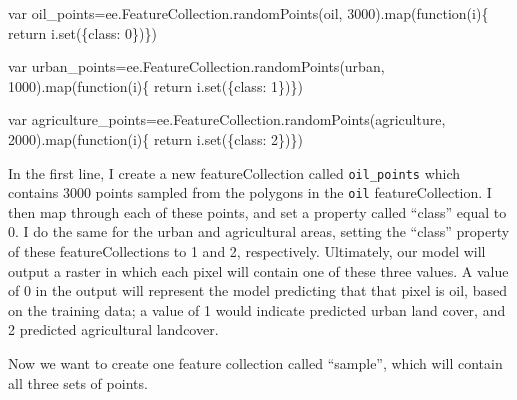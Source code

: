 \documentclass[
  letterpaper,
  DIV=11,
  numbers=noendperiod]{scrreprt}
\newenvironment{Shaded}{\begin{snugshade}}{\end{snugshade}}
\newcommand{\AttributeTok}[1]{\textcolor[rgb]{0.40,0.45,0.13}{#1}}
\newcommand{\ControlFlowTok}[1]{\textcolor[rgb]{0.00,0.23,0.31}{#1}}
\newcommand{\DecValTok}[1]{\textcolor[rgb]{0.68,0.00,0.00}{#1}}
\newcommand{\FunctionTok}[1]{\textcolor[rgb]{0.28,0.35,0.67}{#1}}
\newcommand{\KeywordTok}[1]{\textcolor[rgb]{0.00,0.23,0.31}{#1}}
\newcommand{\NormalTok}[1]{\textcolor[rgb]{0.00,0.23,0.31}{#1}}
\newcommand{\OperatorTok}[1]{\textcolor[rgb]{0.37,0.37,0.37}{#1}}
\newcommand{\StringTok}[1]{\textcolor[rgb]{0.13,0.47,0.30}{#1}}
\begin{document}
\begin{Shaded}
\begin{Highlighting}[]
\KeywordTok{var}\NormalTok{ oil\_points}\OperatorTok{=}\NormalTok{ee}\OperatorTok{.}\AttributeTok{FeatureCollection}\OperatorTok{.}\FunctionTok{randomPoints}\NormalTok{(oil}\OperatorTok{,} \DecValTok{3000}\NormalTok{)}\OperatorTok{.}\FunctionTok{map}\NormalTok{(}\KeywordTok{function}\NormalTok{(i)\{}
  \ControlFlowTok{return}\NormalTok{ i}\OperatorTok{.}\FunctionTok{set}\NormalTok{(\{}\StringTok{\textquotesingle{}class\textquotesingle{}}\OperatorTok{:} \DecValTok{0}\NormalTok{\})\})}
  
\KeywordTok{var}\NormalTok{ urban\_points}\OperatorTok{=}\NormalTok{ee}\OperatorTok{.}\AttributeTok{FeatureCollection}\OperatorTok{.}\FunctionTok{randomPoints}\NormalTok{(urban}\OperatorTok{,} \DecValTok{1000}\NormalTok{)}\OperatorTok{.}\FunctionTok{map}\NormalTok{(}\KeywordTok{function}\NormalTok{(i)\{}
  \ControlFlowTok{return}\NormalTok{ i}\OperatorTok{.}\FunctionTok{set}\NormalTok{(\{}\StringTok{\textquotesingle{}class\textquotesingle{}}\OperatorTok{:} \DecValTok{1}\NormalTok{\})\})}
  
\KeywordTok{var}\NormalTok{ agriculture\_points}\OperatorTok{=}\NormalTok{ee}\OperatorTok{.}\AttributeTok{FeatureCollection}\OperatorTok{.}\FunctionTok{randomPoints}\NormalTok{(agriculture}\OperatorTok{,} \DecValTok{2000}\NormalTok{)}\OperatorTok{.}\FunctionTok{map}\NormalTok{(}\KeywordTok{function}\NormalTok{(i)\{}
  \ControlFlowTok{return}\NormalTok{ i}\OperatorTok{.}\FunctionTok{set}\NormalTok{(\{}\StringTok{\textquotesingle{}class\textquotesingle{}}\OperatorTok{:} \DecValTok{2}\NormalTok{\})\})}
\end{Highlighting}
\end{Shaded}

In the first line, I create a new featureCollection called
\texttt{oil\_points} which contains 3000 points sampled from the
polygons in the \texttt{oil} featureCollection. I then map through each
of these points, and set a property called ``class'' equal to 0. I do
the same for the urban and agricultural areas, setting the ``class''
property of these featureCollections to 1 and 2, respectively.
Ultimately, our model will output a raster in which each pixel will
contain one of these three values. A value of 0 in the output will
represent the model predicting that that pixel is oil, based on the
training data; a value of 1 would indicate predicted urban land cover,
and 2 predicted agricultural landcover.

Now we want to create one feature collection called ``sample'', which
will contain all three sets of points.
\end{document}

